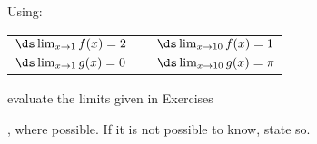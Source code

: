 {\noindent Using:

\begin{tabular}{lll}
$\ds \lim_{x\to1}f(x) = 2$ & \quad\quad &$\ds \lim_{x\to10} f(x) = 1$\\
$\ds \lim_{x\to1}g(x) = 0$ &  & $\ds \lim_{x\to10} g(x) = \pi$
\end{tabular}

\noindent evaluate the limits given in Exercises}
{, where possible. If it is not possible to know, state so.}

